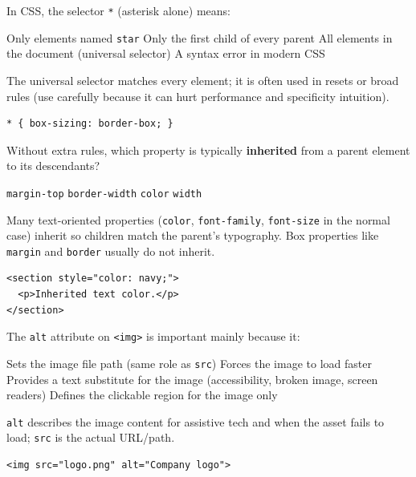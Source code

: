 \question[4]
In CSS, the selector \texttt{*} (asterisk alone) means:
\begin{choices}
  \choice Only elements named \texttt{star}
  \choice Only the first child of every parent
  \CorrectChoice All elements in the document (universal selector)
  \choice A syntax error in modern CSS
\end{choices}
\begin{solution}
  The universal selector matches every element; it is often used in resets or broad rules (use carefully because it can hurt performance and specificity intuition).
\begin{lstlisting}[style=cssinline]
* { box-sizing: border-box; }
\end{lstlisting}
\end{solution}

\question[4]
Without extra rules, which property is typically \textbf{inherited} from a parent element to its descendants?
\begin{choices}
  \choice \texttt{margin-top}
  \choice \texttt{border-width}
  \CorrectChoice \texttt{color}
  \choice \texttt{width}
\end{choices}
\begin{solution}
  Many text-oriented properties (\texttt{color}, \texttt{font-family}, \texttt{font-size} in the normal case) inherit so children match the parent's typography. Box properties like \texttt{margin} and \texttt{border} usually do not inherit.
\begin{lstlisting}[style=htmlinline]
<section style="color: navy;">
  <p>Inherited text color.</p>
</section>
\end{lstlisting}
\end{solution}

\newpage

\question[4]
The \texttt{alt} attribute on \texttt{<img>} is important mainly because it:
\begin{choices}
  \choice Sets the image file path (same role as \texttt{src})
  \choice Forces the image to load faster
  \CorrectChoice Provides a text substitute for the image (accessibility, broken image, screen readers)
  \choice Defines the clickable region for the image only
\end{choices}
\begin{solution}
  \texttt{alt} describes the image content for assistive tech and when the asset fails to load; \texttt{src} is the actual URL/path.
\begin{lstlisting}[style=htmlinline]
<img src="logo.png" alt="Company logo">
\end{lstlisting}
\end{solution}

